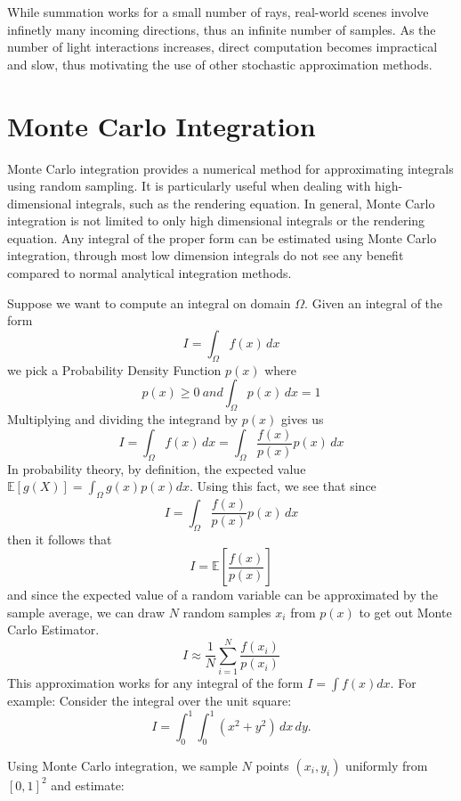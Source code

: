 \documentclass[12pt]{article}
\begin{document}
While summation works for a small number of rays, real-world scenes involve infinetly many incoming directions, thus an infinite number of samples. As the number of light interactions increases, direct computation becomes impractical and slow, thus motivating the use of other stochastic approximation methods.



\section{Monte Carlo Integration}

Monte Carlo integration provides a numerical method for approximating integrals using random sampling. It is particularly useful when dealing with high-dimensional integrals, such as the rendering equation. In general, Monte Carlo integration is not limited to only high dimensional integrals or the rendering equation. Any integral of the proper form can be estimated using Monte Carlo integration, through most low dimension integrals do not see any benefit compared to normal analytical integration methods. 
\newline

Suppose we want to compute an integral on domain $\Omega$.
Given an integral of the form
\[
I = \int_\Omega f(x)\,dx
\]
we pick a Probability Density Function $p(x)$ where 
\[
p(x) \geq 0 \ and \int_\Omega p(x)\,dx = 1
\]
Multiplying and dividing the integrand by $p(x)$ gives us 
\[
I = \int_\Omega f(x)\,dx = \int_\Omega \frac{f(x)}{p(x)}p(x)\,dx
\]
In probability theory, by definition, the expected value $\mathbb{E}[g(X)] = \int_\Omega g(x)p(x)dx$.
Using this fact, we see that since 
\[
I  = \int_\Omega \frac{f(x)}{p(x)}p(x)\,dx
\]
then it follows that
\[
I = \mathbb{E}\left[\frac{f(x)}{p(x)}\right]
\]
and since the expected value of a random variable can be approximated by the sample average, we can draw $N$ random samples $x_i$ from $p(x)$ to get out Monte Carlo Estimator.
\[
I \approx \frac{1}{N}\sum_{i=1}^N \frac{f(x_i)}{p(x_i)} 
\]
This approximation works for any integral of the form $I = \int f(x)dx$.
\newline
For example:
\newline
Consider the integral over the unit square:
\[
I = \int_0^1 \int_0^1 (x^2 + y^2)\, dx\, dy.
\]

Using Monte Carlo integration, we sample $N$ points $(x_i, y_i)$ uniformly
from $[0,1]^2$ and estimate:
\end{document}
